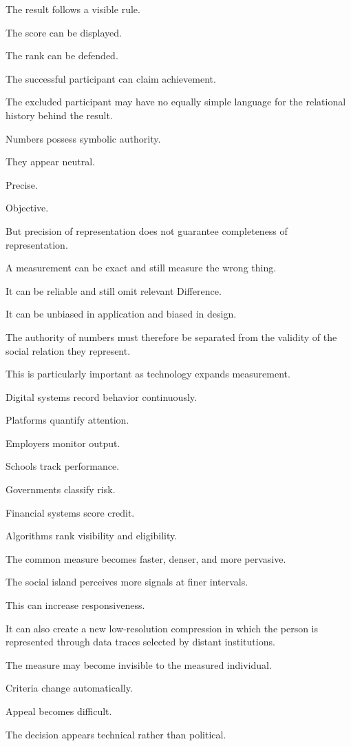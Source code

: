 The result follows a visible rule.

The score can be displayed.

The rank can be defended.

The successful participant can claim achievement.

The excluded participant may have no equally simple language for the relational history behind the result.

Numbers possess symbolic authority.

They appear neutral.

Precise.

Objective.

But precision of representation does not guarantee completeness of representation.

A measurement can be exact and still measure the wrong thing.

It can be reliable and still omit relevant Difference.

It can be unbiased in application and biased in design.

The authority of numbers must therefore be separated from the validity of the social relation they represent.

This is particularly important as technology expands measurement.

Digital systems record behavior continuously.

Platforms quantify attention.

Employers monitor output.

Schools track performance.

Governments classify risk.

Financial systems score credit.

Algorithms rank visibility and eligibility.

The common measure becomes faster, denser, and more pervasive.

The social island perceives more signals at finer intervals.

This can increase responsiveness.

It can also create a new low-resolution compression in which the person is represented through data traces selected by distant institutions.

The measure may become invisible to the measured individual.

Criteria change automatically.

Appeal becomes difficult.

The decision appears technical rather than political.

